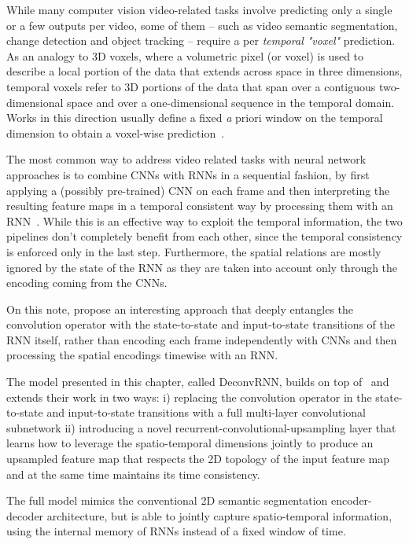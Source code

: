 While many computer vision video-related tasks involve predicting only a single
or a few outputs per video, some of them -- such as video semantic
segmentation, change detection and object tracking -- require a per
\emph{temporal "voxel"} prediction. As an analogy to 3D voxels, where a
volumetric pixel (or voxel) is used to describe a local portion of the data
that extends across space in three dimensions, temporal voxels refer to 3D
portions of the data that span over a contiguous two-dimensional space and over
a one-dimensional sequence in the temporal domain.
Works in this direction usually define a fixed {\emph a priori} window on the
temporal dimension to obtain a voxel-wise prediction~\citep{Tran16v2v}.

The most common way to address video related tasks with neural network
approaches is to combine CNNs with RNNs in a sequential fashion, by first
applying a (possibly pre-trained) CNN on each frame and then interpreting the
resulting feature maps in a temporal consistent way by processing them with an
RNN~\cite{Donahue-et-al-arxiv2014,Vinyals-et-al-CVPR2015,Karpathy+Li-CVPR2015,
Venugopalan_2015_ICCV}. While this is an effective way to exploit the temporal
information, the two pipelines don't completely benefit from each other, since
the temporal consistency is enforced only in the last step. Furthermore, the
spatial relations are mostly ignored by the state of the RNN as they are taken
into account only through the encoding coming from the CNNs.

On this note, \cite{ShiCWYWW15} propose an interesting approach that deeply
entangles the convolution operator with the state-to-state and input-to-state
transitions of the RNN itself, rather than encoding each frame independently
with CNNs and then processing the spatial encodings timewise with an RNN.

The model presented in this chapter, called DeconvRNN, builds on top
of~\cite{ShiCWYWW15} and extends their work in two ways: i) replacing the
convolution operator in the state-to-state and input-to-state transitions with
a full multi-layer convolutional subnetwork ii) introducing a novel
recurrent-convolutional-upsampling layer that learns how to leverage the
spatio-temporal dimensions jointly to produce an upsampled feature map that
respects the 2D topology of the input feature map and at the same time
maintains its time consistency.

The full model mimics the conventional 2D semantic segmentation encoder-decoder
architecture, but is able to jointly capture spatio-temporal information, using
the internal memory of RNNs instead of a fixed window of time.

